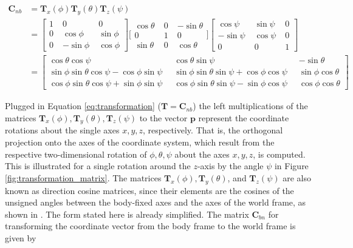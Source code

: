 \begin{equation}\label{eq:transformation_matrices}
\begin{split}
\mathbf{C}_{nb} & = \mathbf{T}_x(\phi) \mathbf{T}_y(\theta) \mathbf{T}_z(\psi) \\
 & = {\left[ \begin{smallmatrix}
    1 \; & 0 \; & 0 \\
    0 \; & \cos \phi \; & \sin \phi \\
    0 \; & -\sin \phi \; & \cos \phi
    \end{smallmatrix}\right]}
    {\bigg[ \begin{smallmatrix}
    \cos \theta \; & 0 \; & -\sin \theta \\
    0 \; & 1 \; & 0 \\
    \sin \theta \; & 0 \; & \cos \theta
    \end{smallmatrix} \bigg]}
    {\left[\begin{smallmatrix}
    \cos \psi \; & \sin \psi \; & 0 \\
    -\sin \psi \; & \cos \psi \; & 0 \\
    0 \; & 0 \; & 1
    \end{smallmatrix}\right]}\\
 & = {\left[\begin{smallmatrix}
   \cos \theta \cos \psi \; &
    \cos \theta \sin \psi \; &
   -\sin \theta \\
    \sin \phi \sin \theta \cos \psi - \cos \phi \sin \psi \;\; &
    \sin \phi \sin \theta \sin \psi + \cos \phi \cos \psi \;\; &
    \sin \phi \cos \theta \\
    \cos \phi \sin \theta \cos \psi + \sin \phi \sin \psi \;\; &
    \cos \phi \sin \theta \sin \psi - \sin \phi \cos \psi \;\; &
    \cos \phi \cos \theta
  \end{smallmatrix}\right]}
\end{split}
\end{equation}

\noindent
Plugged in Equation \ref{eq:transformation} ($\mathbf{T} = \mathbf{C}_{nb}$) the left multiplications of the matrices $\mathbf{T}_x(\phi), \mathbf{T}_y(\theta), \mathbf{T}_z(\psi)$ to the vector $\mathbf{p}$ represent the coordinate rotations about the single axes $x, y, z$, respectively. That is, the orthogonal projection onto the axes of the coordinate system, which result from the respective two-dimensional rotation of $\phi, \theta, \psi$ about the axes $x, y, z$, is computed. This is illustrated for a single rotation around the $z$-axis by the angle $\psi$ in Figure \ref{fig:transformation_matrix}. The matrices $\mathbf{T}_x(\phi), \mathbf{T}_y(\theta)$, and $\mathbf{T}_z(\psi)$ are also known as direction cosine matrices, since their elements are the cosines of the unsigned angles between the body-fixed axes and the axes of the world frame, as shown in \cite{diebel2006attitude}. The form stated here is already simplified. The matrix $\mathbf{C}_{bn}$ for transforming the coordinate vector from the body frame to the world frame is given by

